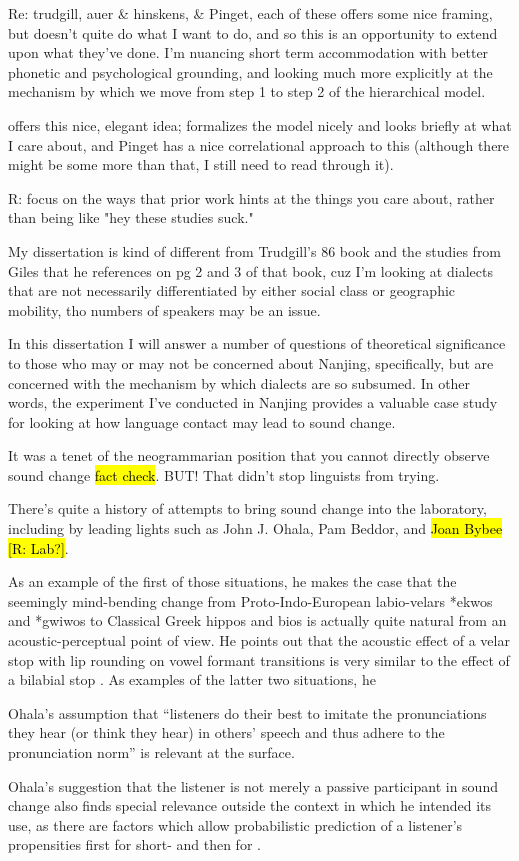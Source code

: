     Re: trudgill, auer & hinskens, & Pinget, each of these offers some nice framing, but doesn't quite do what I want to do, and so this is an opportunity to extend upon what they've done. I'm nuancing short term accommodation with better phonetic and psychological grounding, and looking much more explicitly at the mechanism by which we move from step 1 to step 2 of the hierarchical model.

    \cite{trudgill1986dialects} offers this nice, elegant idea; \cite{auer2005role} formalizes the model nicely and looks briefly at what I care about, and Pinget has a nice correlational approach to this (although there might be some more than that, I still need to read through it).

    R: focus on the ways that prior work hints at the things you care about, rather than being like "hey these studies suck."
    
    My dissertation is kind of different from Trudgill's 86 book and the studies from Giles that he references on pg 2 and 3 of that book, cuz I'm looking at dialects that are not necessarily differentiated by either social class or geographic mobility, tho numbers of speakers may be an issue.
    
    
    In this dissertation I will answer a number of questions of theoretical significance to those who may or may not be concerned about Nanjing, specifically, but are concerned with the mechanism by which dialects are so subsumed. In other words, the experiment I've conducted in Nanjing provides a valuable case study for looking at how language contact may lead to sound change.

    
    It was a tenet of the neogrammarian position that you cannot directly observe sound change \hl{fact check}. BUT! That didn't stop linguists from trying. 
    
    There's quite a history of attempts to bring sound change into the laboratory, including by leading lights such as John J. Ohala, Pam Beddor, and \hl{Joan Bybee [R: Lab?]}.
    
    As an example of the first of those situations, he makes the case that the seemingly mind-bending change from Proto-Indo-European labio-velars *ekwos and *gwiwos to Classical Greek hippos and bios is actually quite natural from an acoustic-perceptual point of view. He points out that the acoustic effect of a velar stop with lip rounding on vowel formant transitions is very similar to the effect of a bilabial stop \citep[p.182]{ohala1989sound}. As examples of the latter two situations, he 
    
    Ohala's assumption that ``listeners do their best to imitate the pronunciations they hear (or think they hear) in others' speech and thus adhere to the pronunciation norm'' \citeyearpar[p.191]{ohala1989sound} is relevant at the surface.
    
    Ohala's \citeyearpar{ohala1981listener} suggestion that the listener is not merely a passive participant in sound change also finds special relevance outside the context in which he intended its use, as there are factors which allow probabilistic prediction of a listener's propensities first for short- and then for \lta{}.
